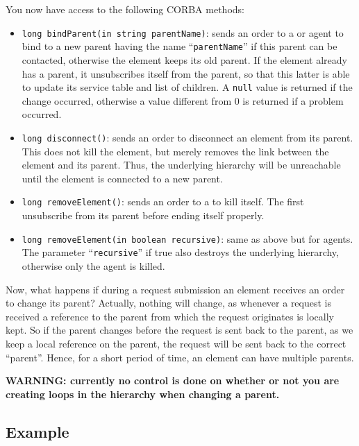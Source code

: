 You now have access to the following CORBA methods:
\begin{itemize}
\item \verb|long bindParent(in string parentName)|: sends an order to
  a \sed or agent to bind to a new parent having the name
  ``\verb|parentName|'' if this parent can be contacted, otherwise the
  element keeps its old parent. If the element already has a parent,
  it unsubscribes itself from the parent, so that this latter is able
  to update its service table and list of children. A \texttt{null} value is
  returned if the change occurred, otherwise a value different from 0
  is returned if a problem occurred.

\item \verb|long disconnect()|: sends an order to disconnect an
  element from its parent. This does not kill the element, but merely
  removes the link between the element and its parent. Thus, the
  underlying hierarchy will be unreachable until the element is
  connected to a new parent.

\item \verb|long removeElement()|: sends an order to a \sed to kill
  itself. The \sed first unsubscribe from its parent before ending
  itself properly.

\item \verb|long removeElement(in boolean recursive)|: same as above
  but for agents. The parameter ``\verb|recursive|'' if true also
  destroys the underlying hierarchy, otherwise only the agent is
  killed.
\end{itemize}

Now, what happens if during a request submission an element receives
an order to change its parent? Actually, nothing will change, as
whenever a request is received a reference to the parent from which
the request originates is locally kept. So if the parent changes
before the request is sent back to the parent, as we keep a local
reference on the parent, the request will be sent back to the correct
``parent''. Hence, for a short period of time, an element can have
multiple parents.

\textbf{WARNING: currently no control is done on whether or not you
  are creating loops in the hierarchy when changing a parent.}

\subsection{Example}

